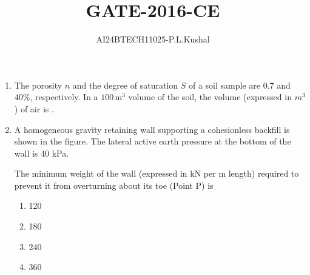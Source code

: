 \documentclass[journal]{IEEEtran}
\begin{document}

\vspace{3cm}

\title{GATE-2016-CE}
\author{AI24BTECH11025-P.L.Kushal}
{\let\newpage\relax\maketitle}

\renewcommand{\thefigure}{\theenumi}
\renewcommand{\thetable}{\theenumi}
\setlength{\intextsep}{10pt} %


\renewcommand{\thetable}{\theenumi}
\begin{enumerate}[start=40]

\item The porosity  $n$  and the degree of saturation $S$ of a soil sample are 0.7 and $40\%$, respectively. In a $100 \, \text{m}^3$ volume of the soil, the volume (expressed in $m^3$) of air is \underline{\hspace{2cm}}.\\
\item A homogeneous gravity retaining wall supporting a cohesionless backfill is shown in the figure. The lateral active earth pressure at the bottom of the wall is 40 kPa. 








The minimum weight of the wall (expressed in kN per m length) required to prevent it from overturning about its toe (Point P) is  
\begin{multicols}{4}
\begin{enumerate}
\item 120 
\item 180
\item 240
\item 360
\end{enumerate} 
\end{multicols}





\end{enumerate}
\end{document}
